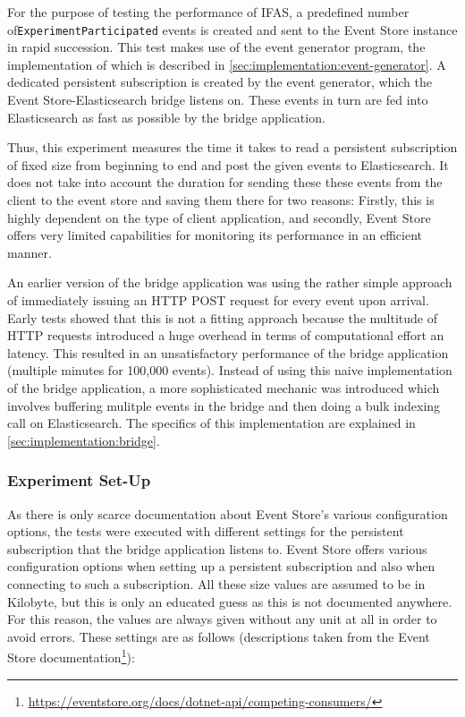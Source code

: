 For the purpose of testing the performance of \ac{IFAS}, a predefined number of\linebreak \texttt{ExperimentParticipated} events is created and sent to the Event Store instance in rapid succession.
This test makes use of the event generator program, the implementation of which is described in \cref{sec:implementation:event-generator}.
A dedicated persistent subscription is created by the event generator, which the Event Store-Elasticsearch bridge listens on.
These events in turn are fed into Elasticsearch as fast as possible by the bridge application.

Thus, this experiment measures the time it takes to read a persistent subscription of fixed size from beginning to end and post the given events to Elasticsearch.
It does not take into account the duration for sending these these events from the client to the event store and saving them there for two reasons:
Firstly, this is highly dependent on the type of client application, and secondly, Event Store offers very limited capabilities for monitoring its performance in an efficient manner.

An earlier version of the bridge application was using the rather simple approach of immediately issuing an \ac{HTTP} POST request for every event upon arrival.
Early tests showed that this is not a fitting approach because the multitude of HTTP requests introduced a huge overhead in terms of computational effort an latency.
This resulted in an unsatisfactory performance of the bridge application (multiple minutes for 100,000 events).
Instead of using this naive implementation of the bridge application, a more sophisticated mechanic was introduced which involves buffering mulitple events in the bridge and then doing a bulk indexing call on Elasticsearch.
The specifics of this implementation are explained in \cref{sec:implementation:bridge}.

\subsubsection{Experiment Set-Up}

As there is only scarce documentation about Event Store's various configuration options, the tests were executed with different settings for the persistent subscription that the bridge application listens to.
Event Store offers various configuration options when setting up a persistent subscription and also when connecting to such a subscription.
All these size values are assumed to be in Kilobyte, but this is only an educated guess as this is not documented anywhere.
For this reason, the values are always given without any unit at all in order to avoid errors.
These settings are as follows (descriptions taken from the Event Store documentation\footnote{\url{https://eventstore.org/docs/dotnet-api/competing-consumers/}}):

